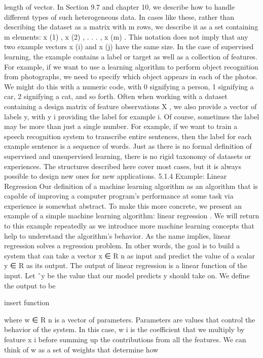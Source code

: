 \documentclass[11pt]{article}
\begin{document}
length of vector. In Section 9.7 and chapter 10, we describe how to handle diﬀerent
types of such heterogeneous data. In cases like these, rather than describing the
dataset as a matrix with
m
rows, we describe it as a set containing
m
elements:
{x
(1)
, x
(2)
, . . . , x
(m)
}
. This notation does not imply that any two example vectors
x
(i)
and x
(j)
have the same size.
In the case of supervised learning, the example contains a label or target as
well as a collection of features. For example, if we want to use a learning algorithm
to perform object recognition from photographs, we need to specify which object
appears in each of the photos. We might do this with a numeric code, with 0
signifying a person, 1 signifying a car, 2 signifying a cat, and so forth. Often when
working with a dataset containing a design matrix of feature observations
X
, we
also provide a vector of labels y, with y
i
providing the label for example i.
Of course, sometimes the label may be more than just a single number. For
example, if we want to train a speech recognition system to transcribe entire
sentences, then the label for each example sentence is a sequence of words.
Just as there is no formal deﬁnition of supervised and unsupervised learning,
there is no rigid taxonomy of datasets or experiences. The structures described here
cover most cases, but it is always possible to design new ones for new applications.
5.1.4 Example: Linear Regression
Our deﬁnition of a machine learning algorithm as an algorithm that is capable
of improving a computer program’s performance at some task via experience is
somewhat abstract. To make this more concrete, we present an example of a
simple machine learning algorithm:
linear regression
. We will return to this
example repeatedly as we introduce more machine learning concepts that help to
understand the algorithm’s behavior.
As the name implies, linear regression solves a regression problem. In other
words, the goal is to build a system that can take a vector
x ∈ R
n
as input and
predict the value of a scalar
y ∈ R
as its output. The output of linear regression is
a linear function of the input. Let
ˆy
be the value that our model predicts
y
should
take on. We deﬁne the output to be

    insert function

where w ∈ R
n
is a vector of parameters.
Parameters are values that control the behavior of the system. In this case,
w
i
is
the coeﬃcient that we multiply by feature
x
i
before summing up the contributions
from all the features. We can think of
w
as a set of
weights
that determine how
\end{document}
